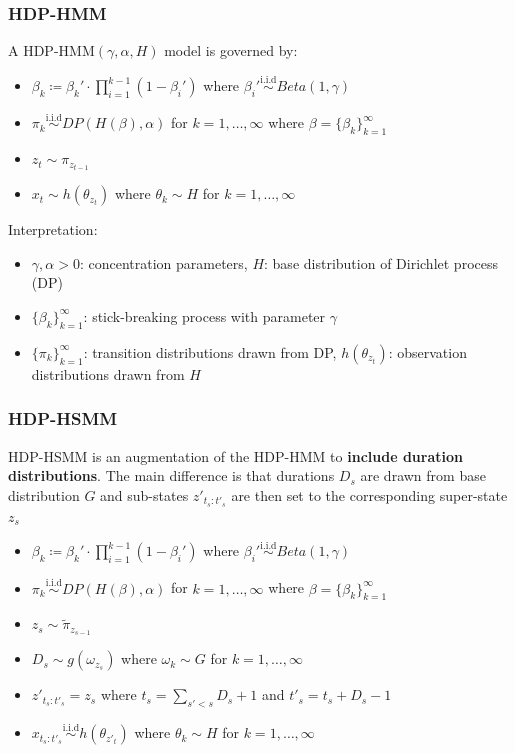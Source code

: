 \documentclass{beamer}
\begin{document}
\begin{frame}
    \frametitle{HDP-HMM}
    A HDP-HMM$(\gamma, \alpha, H)$ model is governed by:
    \begin{itemize}
      \item $\beta_k \coloneqq \beta_k'\cdot \prod_{i=1}^{k-1} (1-\beta_i')$ where $\beta_i' \overset{\text{i.i.d}}{\sim} Beta(1,\gamma)$
      \item $\pi_k \overset{\text{i.i.d}}{\sim} DP(H(\beta), \alpha)$ for $k = 1, \dots, \infty$ where $\beta = \{\beta_k\}_{k=1}^{\infty}$
      \item $z_t \sim \pi_{z_{t-1}}$
      \item $x_t \sim h(\theta_{z_t})$ where $\theta_{k} \sim H$ for $k = 1, \dots, \infty$
    \end{itemize}
    Interpretation:
    \begin{itemize}
        \item $\gamma, \alpha > 0$: concentration parameters, $H$: base distribution of Dirichlet process (DP)
        \item $\{\beta_k\}_{k=1}^{\infty}$: stick-breaking process with parameter $\gamma$
        \item $\{\pi_k \}_{k=1}^{\infty}$: transition distributions drawn from DP, $h(\theta_{z_t})$: observation distributions drawn from $H$
    \end{itemize}
\end{frame}

\begin{frame}
    \frametitle{HDP-HSMM}
    HDP-HSMM is an augmentation of the HDP-HMM to \textbf{include duration distributions}. The main difference is that durations $D_s$ are drawn from base distribution $G$ and sub-states $z'_{t_{s}:t'_{s}}$ are then set to the corresponding super-state $z_{s}$
    \begin{itemize}
      \item $\beta_k \coloneqq \beta_k'\cdot \prod_{i=1}^{k-1} (1-\beta_i')$ where $\beta_i' \overset{\text{i.i.d}}{\sim} Beta(1,\gamma)$
      \item $\pi_k \overset{\text{i.i.d}}{\sim} DP(H(\beta), \alpha)$ for $k = 1, \dots, \infty$ where $\beta = \{\beta_k\}_{k=1}^{\infty}$
      \item $z_s \sim \tilde{\pi}_{z_{s-1}}$
      \item $D_s \sim g(\omega_{z_s})$ where $\omega_k \sim G$ for $k = 1, \dots, \infty$
      \item $z'_{t_{s}:t'_{s}} = z_s$ where $t_{s} = \sum_{s' < s} D_s + 1$ and $t'_{s} = t_{s} + D_s - 1$
      \item $x_{t_{s}: t'_{s}} \overset{\text{i.i.d}}{\sim} h(\theta_{z'_t})$ where $\theta_{k} \sim H$ for $k = 1, \dots, \infty$
    \end{itemize}
\end{frame}
\end{document}
